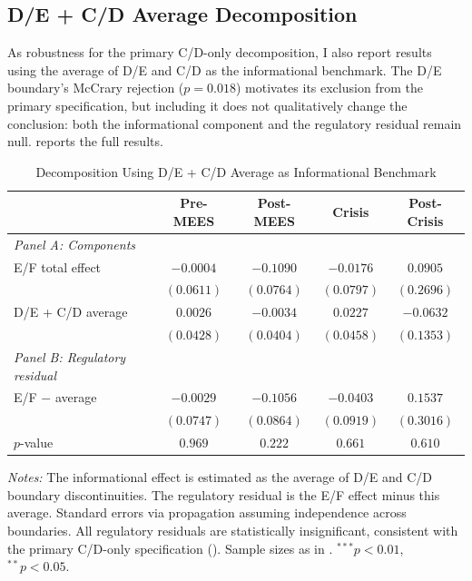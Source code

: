 \documentclass[12pt]{article}
\begin{document}
\subsection{D/E + C/D Average Decomposition}

As robustness for the primary C/D-only decomposition, I also report results using the average of D/E and C/D as the informational benchmark. The D/E boundary's McCrary rejection ($p = 0.018$) motivates its exclusion from the primary specification, but including it does not qualitatively change the conclusion: both the informational component and the regulatory residual remain null.  reports the full results.

\begin{table}[H]
\centering
\caption{Decomposition Using D/E + C/D Average as Informational Benchmark}
\label{tab:decomp_avg}
\begin{tabular}{lcccc}
\toprule
 & Pre-MEES & Post-MEES & Crisis & Post-Crisis \\
\midrule
\textit{Panel A: Components} & & & & \\
\quad E/F total effect & $-0.0004$ & $-0.1090$ & $-0.0176$ & $0.0905$ \\
 & $(0.0611)$ & $(0.0764)$ & $(0.0797)$ & $(0.2696)$ \\
\addlinespace
\quad D/E + C/D average & $0.0026$ & $-0.0034$ & $0.0227$ & $-0.0632$ \\
 & $(0.0428)$ & $(0.0404)$ & $(0.0458)$ & $(0.1353)$ \\
\addlinespace
\textit{Panel B: Regulatory residual} & & & & \\
\quad E/F $-$ average & $-0.0029$ & $-0.1056$ & $-0.0403$ & $0.1537$ \\
 & $(0.0747)$ & $(0.0864)$ & $(0.0919)$ & $(0.3016)$ \\
\quad $p$-value & $0.969$ & $0.222$ & $0.661$ & $0.610$ \\
\bottomrule
\end{tabular}
\begin{minipage}{\textwidth}
\footnotesize
\textit{Notes:} The informational effect is estimated as the average of D/E and C/D boundary discontinuities. The regulatory residual is the E/F effect minus this average. Standard errors via propagation assuming independence across boundaries. All regulatory residuals are statistically insignificant, consistent with the primary C/D-only specification (). Sample sizes as in .
$^{***}p<0.01$, $^{**}p<0.05$.
\end{minipage}
\end{table}
\end{document}
